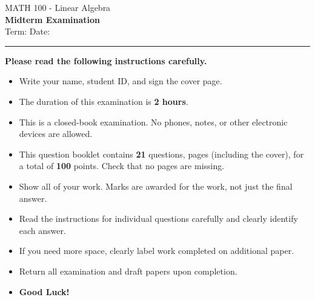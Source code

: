 \documentclass[11pt]{article}
\newif\ifshowsolutions
\def\CourseTitle{Linear Algebra}
\def\ExamName{Midterm Examination}
\def\CourseNumber{MATH 100}
\def\ExamDate{October 28}
\def\Term{Fall 2026}
\def\ExamDuration{2 hours}
\def\TotalQuestions{21}
\def\TotalPoints{100}
\begin{document}
\thispagestyle{coverpage}

\begin{center}
  \Large
  {{\CourseNumber} - {\CourseTitle}}\\
  \vspace{5pt}
  \textbf{\ExamName}\\
  \vspace{5pt}
  Term: \enspace {\Term} \qquad Date: \enspace {\ExamDate}
  \ifshowsolutions
    \\\vspace{8pt}
    {\large\color{solutionblue}\bfseries Instructor solution version}
  \fi
\end{center}

\vspace{10pt}
\hrule
\vspace{10pt}

\begin{center}
\vspace{10pt}
\textbf{Please read the following instructions carefully.}
\vspace{10pt}
\begin{itemize}
  \item Write your name, student ID, and sign the cover page.
  \item The duration of this examination is \textbf{\ExamDuration}.
  \item This is a closed-book examination. No phones, notes, or other electronic devices are allowed.
  \item This question booklet contains \textbf{\TotalQuestions} questions, \textbf{\pageref{LastPage}} pages (including the cover), for a total of \textbf{\TotalPoints} points. Check that no pages are missing.
  \item Show all of your work. Marks are awarded for the work, not just the final answer.
  \item Read the instructions for individual questions carefully and clearly identify each answer.
  \item If you need more space, clearly label work completed on additional paper.
  \item Return all examination and draft papers upon completion.
  \item \textbf{\large Good Luck!}
\end{itemize}
\end{center}

\vspace{2cm}
\noindent
\begin{minipage}{0.58\linewidth}
  \raggedright
   \\[26pt]
   \\[26pt]
   \\[45pt]
\end{minipage}
\end{document}
